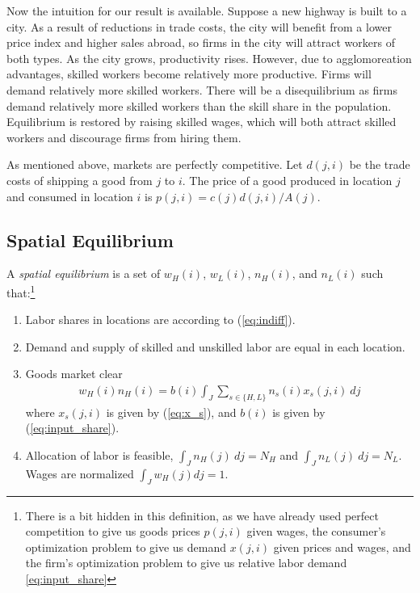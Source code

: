 \documentclass[12 pt]{article}
\begin{document}
Now the intuition for our result is available.  Suppose a new highway is built to a city. As a result of reductions in trade costs, the city will benefit from a lower price index and higher sales abroad, so firms in the city will attract workers of both types.  As the city grows, productivity rises. However, due to agglomoreation advantages, skilled workers become relatively more productive.  Firms will demand relatively more skilled workers.  There will be a disequilibrium as firms demand relatively more skilled workers than the skill share in the population.  Equilibrium is restored by raising skilled wages, which will both attract skilled workers and discourage firms from hiring them.

As mentioned above, markets are perfectly competitive. Let $d(j,i)$ be the trade costs of shipping a good from $j$ to $i$. The price of a good produced in location $j$ and consumed in location $i$ is $p(j,i) = c(j)d(j,i)/A(j)$. 

\subsection{Spatial Equilibrium}

A \textit{spatial equilibrium} is a set of $w_H(i)$, $w_L(i)$, $n_H(i)$, and $n_L(i)$ such that:\footnote{There is a bit hidden in this definition, as we have already used perfect competition to give us goods prices $p(j,i)$ given wages, the consumer's optimization problem to give us demand $x(j,i)$ given prices and wages, and the firm's optimization problem to give us relative labor demand \eqref{eq:input_share}}
\begin{enumerate}
\item Labor shares in locations are according to (\ref{eq:indiff}).
\item Demand and supply of skilled and unskilled labor are equal in each location.
\item Goods market clear
\begin{eqnarray}\label{eq:goods_mkt_clear}
	w_H(i) n_H(i) =  b(i) \int_J \sum_{s \in \{H,L\}} n_s(i)x_s(j,i) ~dj 
\end{eqnarray}
where $x_s(j,i)$ is given by (\ref{eq:x_s}), and $b(i)$ is given by (\ref{eq:input_share}).
\item Allocation of labor is feasible, $\int_J n_H(j) ~dj = N_H$ and $\int_J n_L(j) ~dj = N_L$. Wages are normalized $\int_J w_H(j) dj =1$.
\end{enumerate}

\vspace{5mm}
\end{document}
